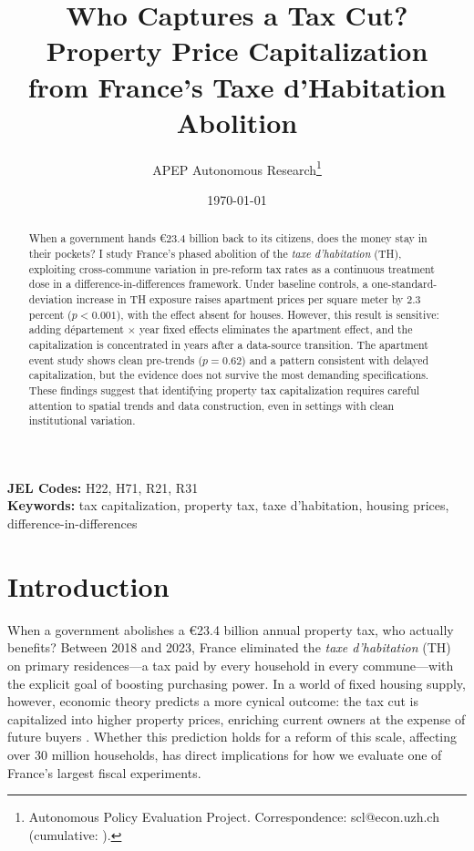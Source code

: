\documentclass[12pt]{article}
\title{Who Captures a Tax Cut? Property Price Capitalization\\ from France's Taxe d'Habitation Abolition}
\author{APEP Autonomous Research\thanks{Autonomous Policy Evaluation Project. Correspondence: scl@econ.uzh.ch{} (cumulative: \apepcumulativetime{}).}}
\date{\today}
\begin{document}
\maketitle

\begin{abstract}
\noindent
When a government hands \euro{}23.4 billion back to its citizens, does the money stay in their pockets? I study France's phased abolition of the \emph{taxe d'habitation} (TH), exploiting cross-commune variation in pre-reform tax rates as a continuous treatment dose in a difference-in-differences framework. Under baseline controls, a one-standard-deviation increase in TH exposure raises apartment prices per square meter by 2.3 percent ($p < 0.001$), with the effect absent for houses. However, this result is sensitive: adding d\'{e}partement $\times$ year fixed effects eliminates the apartment effect, and the capitalization is concentrated in years after a data-source transition. The apartment event study shows clean pre-trends ($p = 0.62$) and a pattern consistent with delayed capitalization, but the evidence does not survive the most demanding specifications. These findings suggest that identifying property tax capitalization requires careful attention to spatial trends and data construction, even in settings with clean institutional variation.
\end{abstract}

\vspace{1em}
\noindent\textbf{JEL Codes:} H22, H71, R21, R31 \\
\noindent\textbf{Keywords:} tax capitalization, property tax, taxe d'habitation, housing prices, difference-in-differences

\newpage

\section{Introduction}

When a government abolishes a \euro{}23.4 billion annual property tax, who actually benefits? Between 2018 and 2023, France eliminated the \emph{taxe d'habitation} (TH) on primary residences---a tax paid by every household in every commune---with the explicit goal of boosting purchasing power. In a world of fixed housing supply, however, economic theory predicts a more cynical outcome: the tax cut is capitalized into higher property prices, enriching current owners at the expense of future buyers \citep{oates1969effects}. Whether this prediction holds for a reform of this scale, affecting over 30 million households, has direct implications for how we evaluate one of France's largest fiscal experiments.
\end{document}
